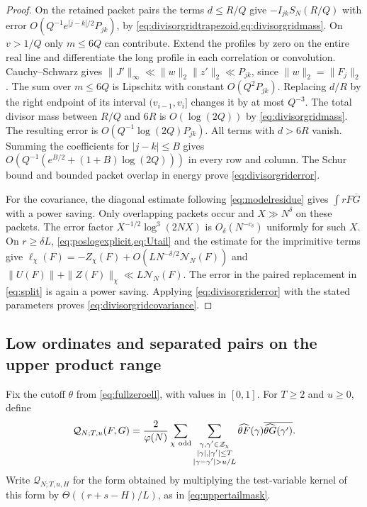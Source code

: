 \documentclass[11pt,a4paper]{article}
\numberwithin{equation}{section}
\newcommand{\NN}{\mathcal N_N}
\begin{document}
\begin{proof}
On the retained packet pairs the terms $d\le R/Q$ give
$-I_{jk}S_N(R/Q)$ with error $O(Q^{-1}e^{|j-k|/2}P_{jk})$,
by \cref{eq:divisorgridtrapezoid,eq:divisorgridmass}.
On $v>1/Q$ only $m\le6Q$ can contribute. Extend the profiles
by zero on the entire real line and differentiate the long
profile in each correlation or convolution. Cauchy--Schwarz
gives $\|J'\|_\infty\ll\|w\|_2\|z'\|_2\ll P_{jk}$,
since $\|w\|_2=\|F_j\|_2$. The sum over $m\le6Q$ is
Lipschitz with constant $O(Q^2 P_{jk})$. Replacing $d/R$ by
the right endpoint of its interval $(v_{i-1},v_i]$ changes
it by at most $Q^{-3}$. The total divisor mass between
$R/Q$ and $6R$ is $O(\log(2Q))$ by \cref{eq:divisorgridmass}.
The resulting error is $O(Q^{-1}\log(2Q)P_{jk})$.
All terms with $d>6R$ vanish. Summing the coefficients for
$|j-k|\le B$ gives $O(Q^{-1}(e^{B/2}+(1+B)\log(2Q)))$
in every row and column. The Schur bound and bounded packet
overlap in energy prove \cref{eq:divisorgriderror}.

For the covariance, the diagonal estimate following
\cref{eq:modelresidue} gives $\int rF\overline G$ with a power
saving. Only overlapping packets occur and $X\gg N^\delta$
on these packets. The error factor $X^{-1/2}\log^3(2NX)$ is
$O_\delta(N^{-c_\delta})$ uniformly for such $X$.
On $r\ge\delta L$, \cref{eq:poslogexplicit,eq:Utail} and the
estimate for the imprimitive terms give
$\ell_\chi(F)=-Z_\chi(F)+O(LN^{-\delta/2}\NN(F))$ and
$\|U(F)\|+\|Z(F)\|_\chi\ll L\NN(F)$.
The error in the paired replacement in \cref{eq:split} is
again a power saving. Applying \cref{eq:divisorgriderror}
with the stated parameters proves \cref{eq:divisorgridcovariance}.
\end{proof}

\subsection{Low ordinates and separated pairs on the upper product range}

Fix the cutoff $\theta$ from \cref{eq:fullzeroell}, with values in
$[0,1]$. For $T\ge2$ and $u\ge0$, define
\[
 \mathcal Q_{N;T,u}(F,G)=
 \frac{2}{\varphi(N)}
 \sum_{\chi\ {\rm odd}}
 \sum_{\substack{\gamma,\gamma'\in\mathcal Z_\chi\\
                  |\gamma|,|\gamma'|\le T\\
                  |\gamma-\gamma'|>u/L}}
       \widehat{\theta F}(\gamma)
       \overline{\widehat{\theta G}(\gamma')}.
\]
Write $\mathcal Q_{N;T,u,H}$ for the form obtained by
multiplying the test-variable kernel of this form by
$\Theta((r+s-H)/L)$, as in \cref{eq:uppertailmask}.
\end{document}

